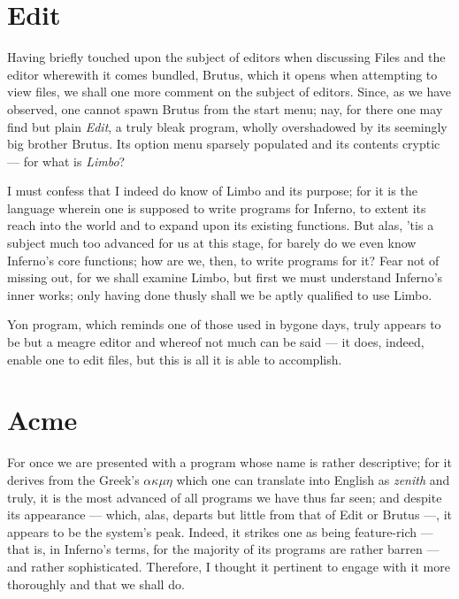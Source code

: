 \documentclass[a5paper,twoside,12pt]{report}
\begin{document}
    \section*{Edit}


    Having briefly touched upon the subject of editors when discussing Files and the editor wherewith it comes bundled, Brutus, which it opens when attempting to view files, we shall one more comment on the subject of editors. Since, as we have observed, one cannot spawn Brutus from the start menu; nay, for there one may find but plain \textit{Edit}, a truly bleak program, wholly overshadowed by its seemingly big brother Brutus. Its option menu sparsely populated and its contents cryptic — for what is \textit{Limbo}?

    I must confess that I indeed do know of Limbo and its purpose; for it is the language wherein one is supposed to write programs for Inferno, to extent its reach into the world and to expand upon its existing functions. But alas, 'tis a subject much too advanced for us at this stage, for barely do we even know Inferno's core functions; how are we, then, to write programs for it? Fear not of missing out, for we shall examine Limbo, but first we must understand Inferno's inner works; only having done thusly shall we be aptly qualified to use Limbo.

    Yon program, which reminds one of those used in bygone days, truly appears to be but a meagre editor and whereof not much can be said — it does, indeed, enable one to edit files, but this is all it is able to accomplish.

    \section*{Acme}

    For once we are presented with a program whose name is rather descriptive; for it derives from the Greek's \textit{$\alpha$$\kappa$$\mu$$\eta$} which one can translate into English as \textit{zenith} and truly, it is the most advanced of all programs we have thus far seen; and despite its appearance — which, alas, departs but little from that of Edit or Brutus —, it appears to be the system's peak. Indeed, it strikes one as being feature-rich — that is, in Inferno's terms, for the majority of its programs are rather barren — and rather sophisticated. Therefore, I thought it pertinent to engage with it more thoroughly and that we shall do.
\end{document}
